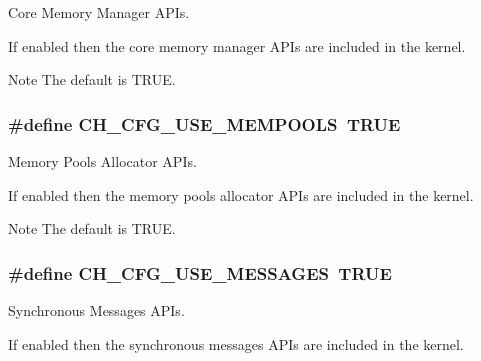 Core Memory Manager A\+P\+Is. 

If enabled then the core memory manager A\+P\+Is are included in the kernel.

\begin{DoxyNote}{Note}
The default is {\ttfamily T\+R\+U\+E}. 
\end{DoxyNote}
\hypertarget{group__config_ga826c1fac997fb6e976c3012d20316444}{
\subsubsection[{C\+H\+\_\+\+C\+F\+G\+\_\+\+U\+S\+E\+\_\+\+M\+E\+M\+P\+O\+O\+L\+S}]{\setlength{\rightskip}{0pt plus 5cm}\#define C\+H\+\_\+\+C\+F\+G\+\_\+\+U\+S\+E\+\_\+\+M\+E\+M\+P\+O\+O\+L\+S~T\+R\+U\+E}}\label{group__config_ga826c1fac997fb6e976c3012d20316444}


Memory Pools Allocator A\+P\+Is. 

If enabled then the memory pools allocator A\+P\+Is are included in the kernel.

\begin{DoxyNote}{Note}
The default is {\ttfamily T\+R\+U\+E}. 
\end{DoxyNote}
\hypertarget{group__config_ga10585bbb78d4b11d82814f38181e5a3a}{
\subsubsection[{C\+H\+\_\+\+C\+F\+G\+\_\+\+U\+S\+E\+\_\+\+M\+E\+S\+S\+A\+G\+E\+S}]{\setlength{\rightskip}{0pt plus 5cm}\#define C\+H\+\_\+\+C\+F\+G\+\_\+\+U\+S\+E\+\_\+\+M\+E\+S\+S\+A\+G\+E\+S~T\+R\+U\+E}}\label{group__config_ga10585bbb78d4b11d82814f38181e5a3a}


Synchronous Messages A\+P\+Is. 

If enabled then the synchronous messages A\+P\+Is are included in the kernel.

